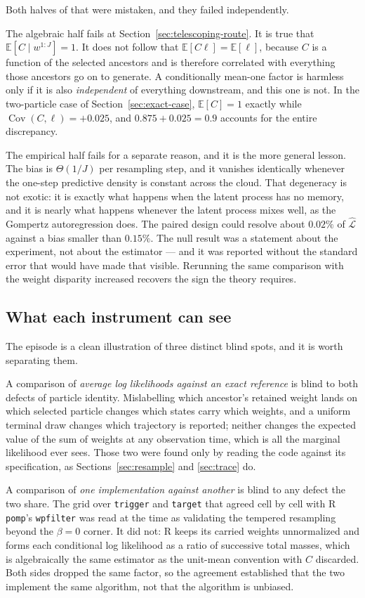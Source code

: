 \documentclass[11pt]{article}
\newcommand{\E}{\mathbb{E}}
\begin{document}
Both halves of that were mistaken, and they failed independently.

The algebraic half fails at Section~\ref{sec:telescoping-route}. It is
true that $\E[C\mid w^{1:J}]=1$. It does not follow that
$\E[C\ell]=\E[\ell]$, because $C$ is a function of the selected ancestors
and is therefore correlated with everything those ancestors go on to
generate. A conditionally mean-one factor is harmless only if it is also
\emph{independent} of everything downstream, and this one is not. In the
two-particle case of Section~\ref{sec:exact-case}, $\E[C]=1$
exactly while $\operatorname{Cov}(C,\ell)=+0.025$, and
$0.875+0.025=0.9$ accounts for the entire discrepancy.

The empirical half fails for a separate reason, and it is the more
general lesson. The bias is $\Theta(1/J)$ per resampling step, and it
vanishes identically whenever the one-step predictive density is constant
across the cloud. That degeneracy is not exotic: it is exactly what
happens when the latent process has no memory, and it is nearly what
happens whenever the latent process mixes well, as the Gompertz
autoregression does. The paired design could resolve about $0.02\%$ of
$\widehat{\mathcal L}$ against a bias smaller than $0.15\%$. The null
result was a statement about the experiment, not about the estimator ---
and it was reported without the standard error that would have made that
visible. Rerunning the same comparison with the weight disparity
increased recovers the sign the theory requires.

\subsection{What each instrument can see}

The episode is a clean illustration of three distinct blind spots, and it
is worth separating them.

A comparison of \emph{average log likelihoods against an exact reference}
is blind to both defects of particle identity. Mislabelling which
ancestor's retained weight lands on which selected particle changes which
states carry which weights, and a uniform terminal draw changes which
trajectory is reported; neither changes the expected value of the sum of
weights at any observation time, which is all the marginal likelihood
ever sees. Those two were found only by reading the code against its
specification, as Sections~\ref{sec:resample} and \ref{sec:trace} do.

A comparison of \emph{one implementation against another} is blind to any
defect the two share. The grid over \texttt{trigger} and \texttt{target}
that agreed cell by cell with R \texttt{pomp}'s \texttt{wpfilter} was
read at the time as validating the tempered resampling beyond the
$\beta=0$ corner. It did not: R keeps its carried weights unnormalized
and forms each conditional log likelihood as a ratio of successive total
masses, which is algebraically the same estimator as the unit-mean
convention with $C$ discarded. Both sides dropped the same factor, so
the agreement established that the two implement the same algorithm, not
that the algorithm is unbiased.
\end{document}

